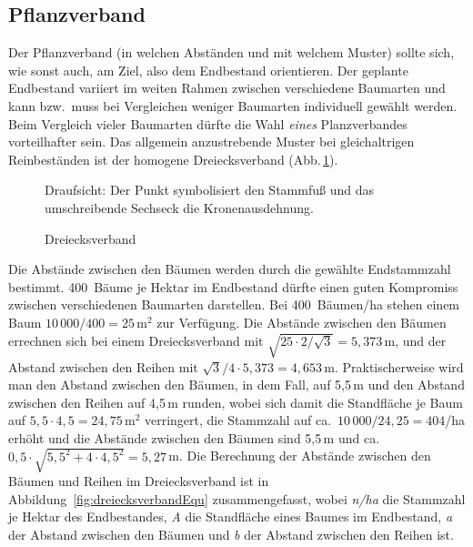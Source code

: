 \documentclass[twocolumn]{scrartcl}
\begin{document}
\subsection{Pflanzverband}

Der Pflanzverband (in welchen Abständen und mit welchem Muster) sollte sich, wie
sonst auch, am Ziel, also dem Endbestand orientieren. Der geplante Endbestand
variiert im weiten Rahmen zwischen verschiedene Baumarten und kann bzw.\ muss
bei Vergleichen weniger Baumarten individuell gewählt werden. Beim Vergleich
vieler Baumarten dürfte die Wahl \emph{eines} Planzverbandes vorteilhafter sein.
Das allgemein anzustrebende Muster bei gleichaltrigen Reinbeständen ist der
homogene Dreiecksverband (Abb.\,\ref{fig:dreiecksverband}).

\begin{figure}[htbp]
  \centering
  \caption{Dreiecksverband}
  \footnotesize{Draufsicht: Der Punkt symbolisiert den Stammfuß und das umschreibende Sechseck die Kronenausdehnung.}
  \label{fig:dreiecksverband}
\end{figure}

Die Abstände zwischen den Bäumen werden durch die gewählte Endstammzahl
bestimmt. 400~Bäume je Hektar im Endbestand dürfte einen guten Kompromiss
zwischen verschiedenen Baumarten darstellen. Bei 400~Bäumen/ha stehen einem Baum
$10\,000 / 400 = 25\,\text{m}^2$ zur Verfügung. Die Abstände zwischen den Bäumen
errechnen sich bei einem Dreiecksverband mit $\sqrt{25 \cdot 2 / \sqrt{3}} =
5,373\,\text{m}$, und der Abstand zwischen den Reihen mit $\sqrt{3}/4\cdot 5,373
= 4,653\,\text{m}$. Praktischerweise wird man den Abstand zwischen den Bäumen,
in dem Fall, auf 5,5\,m und den Abstand zwischen den Reihen auf 4,5\,m runden,
wobei sich damit die Standfläche je Baum auf $5,5 \cdot 4,5 = 24,75\,\text{m}^2$
verringert, die Stammzahl auf ca.\ $10\,000 / 24,25 = 404$/ha erhöht und die
Abstände zwischen den Bäumen sind 5,5\,m und ca.\ $0,5\cdot \sqrt{5,5^2 + 4\cdot
4,5^2} = 5,27$\,m. Die Berechnung der Abstände zwischen den Bäumen und Reihen im
Dreiecksverband ist in Abbildung~\ref{fig:dreiecksverbandEqu} zusammengefasst,
wobei \emph{n/ha} die Stammzahl je Hektar des Endbestandes, \emph{A} die
Standfläche eines Baumes im Endbestand, \emph{a} der Abstand zwischen den Bäumen
und \emph{b} der Abstand zwischen den Reihen ist.
\end{document}
